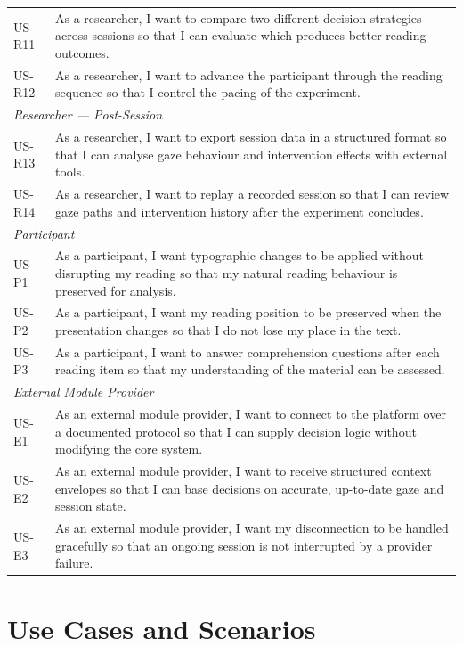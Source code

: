\begin{table}[htbp]
\begin{tabularx}{\linewidth}{@{} l X @{}}
US-R11 & As a researcher, I want to compare two different decision strategies across sessions so that I can evaluate which produces better reading outcomes. \\[2pt]
US-R12 & As a researcher, I want to advance the participant through the reading sequence so that I control the pacing of the experiment. \\
\midrule
\multicolumn{2}{l}{\textit{Researcher --- Post-Session}} \\
\midrule
US-R13 & As a researcher, I want to export session data in a structured format so that I can analyse gaze behaviour and intervention effects with external tools. \\[2pt]
US-R14 & As a researcher, I want to replay a recorded session so that I can review gaze paths and intervention history after the experiment concludes. \\
\midrule
\multicolumn{2}{l}{\textit{Participant}} \\
\midrule
US-P1  & As a participant, I want typographic changes to be applied without disrupting my reading so that my natural reading behaviour is preserved for analysis. \\[2pt]
US-P2  & As a participant, I want my reading position to be preserved when the presentation changes so that I do not lose my place in the text. \\[2pt]
US-P3  & As a participant, I want to answer comprehension questions after each reading item so that my understanding of the material can be assessed. \\
\midrule
\multicolumn{2}{l}{\textit{External Module Provider}} \\
\midrule
US-E1  & As an external module provider, I want to connect to the platform over a documented protocol so that I can supply decision logic without modifying the core system. \\[2pt]
US-E2  & As an external module provider, I want to receive structured context envelopes so that I can base decisions on accurate, up-to-date gaze and session state. \\[2pt]
US-E3  & As an external module provider, I want my disconnection to be handled gracefully so that an ongoing session is not interrupted by a provider failure. \\
\bottomrule
\end{tabularx}
\end{table}

\section{Use Cases and Scenarios}
\label{sec:use-cases}

